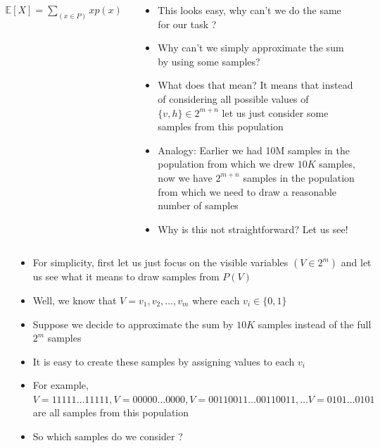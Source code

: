 \begin{frame}
	\begin{columns}
		\begin{overlayarea}{\textwidth}{\textheight}
			\begin{align*}
				\mathbb{E}[X] = \sum_{(x\in P)} x p(x)
			\end{align*}
		\end{overlayarea}
		\begin{overlayarea}{\textwidth}{\textheight}
			\begin{itemize}
				\item<1-> This looks easy, why can't we do the same for our task ?
				\item<2-> Why can't we simply approximate the sum by using some samples?
				\item<3-> What does that mean? It means that instead of considering all possible values of $\{v, h\} \in 2^{m+n}$ let us just consider some samples from this population
				\item<4-> Analogy: Earlier we had 10M samples in the population from which we drew $10K$ samples, now we have $2^{m+n}$ samples in the population from which we need to draw a reasonable number of samples
				\item<5-> Why is this not straightforward? Let us see!
			\end{itemize}
		\end{overlayarea}
	\end{columns}
\end{frame}

\begin{frame}
	\begin{columns}
	\column{0.4\textwidth}
		\begin{overlayarea}{\textwidth}{\textheight}
			
		\end{overlayarea}
	\column{0.6\textwidth}
		\begin{overlayarea}{\textwidth}{\textheight}
			\begin{itemize}
				\item<1-> For simplicity, first let us just focus on the visible variables $(V \in 2^{m})$ and let us see what it means to draw samples from $P(V)$
				\item<2-> Well, we know that $V = v_1, v_2, \ldots, v_m$ where each $v_i \in \{0,1\}$
				\item<3-> Suppose we decide to approximate the sum by $10K$ samples instead of the full $2^{m}$ samples
				\item<4-> It is easy to create these samples by assigning values to each $v_i$
				\item<5-> For example, $V = 11111\ldots 11111, V = 00000\ldots 0000, V = 00110011\ldots 00110011, \ldots V = 0101\ldots 0101$ are all samples from this population
				\item<6-> So which samples do we consider ?
			\end{itemize}
		\end{overlayarea}
	\end{columns}
\end{frame}


